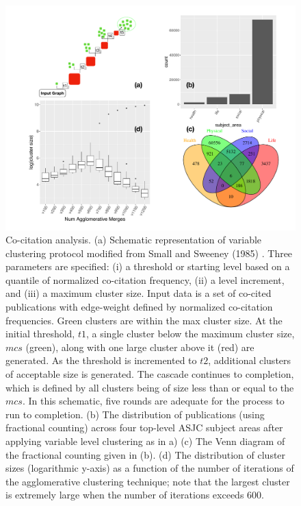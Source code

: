 \newpage
\begin{landscape}
\begin{figure}[ht]
\centering
\includegraphics[width=1.4\textwidth]{vlc_thrice.pdf}
\caption{Co-citation analysis.
(a) Schematic representation of variable clustering protocol modified from Small and Sweeney (1985) \cite{small_clustering_1985}. Three parameters are specified: (i) a threshold or starting level based on a quantile of normalized co-citation frequency, (ii) a level increment, and  (iii) a maximum cluster size. Input data is a set of co-cited publications with edge-weight defined by normalized co-citation frequencies. Green clusters are within the max cluster size. At the initial threshold, $t1$, a single cluster below the maximum cluster size, $mcs$ (green), along with one large cluster above it (red) are generated. As the threshold is incremented to $t2$, additional clusters of acceptable size is generated. The cascade continues to completion, which is defined by all clusters being of size less than or equal to the $mcs$. In this schematic, five rounds are adequate for the process to run to completion.
(b) The distribution of publications (using fractional counting) across four top-level ASJC subject areas after applying variable level clustering as in a)
(c) The Venn diagram of the fractional counting given in (b).
(d) The distribution of cluster sizes (logarithmic y-axis) as a function of the number of iterations of the agglomerative clustering technique; note that the largest cluster is extremely large when the number of iterations exceeds 600.
}
\label{fig:quad-chart}
\end{figure}
\end{landscape}
\newpage

